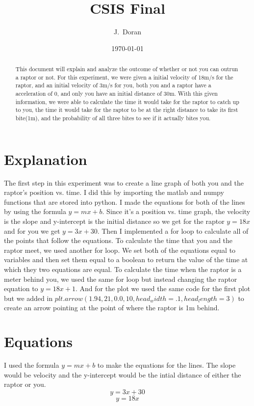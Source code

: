 \documentclass[twocolumn]{revtex4}
\begin{document}
\title{
CSIS Final
}

\author{J.~Doran}

\date{\today}

\begin{abstract}
 	This document will explain and analyze the outcome of whether or not you can outrun a raptor or not. For this experiment, we were given a initial velocity of 18m/s for the raptor, and an initial velocity of 3m/s for you, both you and a raptor have a acceleration of 0, and only you have an initial distance of 30m. With this given information, we were able to calculate the time it would take for the raptor to catch up to you, the time it would take for the raptor to be at the right distance to take its first bite(1m), and the probability of all three bites to see if it actually bites you. 
 	 
\end{abstract}

\maketitle

\section{Explanation}
	The first step in this experiment was to create a line graph of both you and the raptor's position vs. time.  I did this by importing the matlab and numpy functions that are stored into python. I made the equations for both of the lines by using the formula {\it $y=mx+b$}. Since it's a position vs. time graph, the velocity is the slope and y-intercept is the initial distance so we get for the raptor {\it $y=18x$} and for you we get {\it $y=3x+30$}. Then I implemented a for loop to calculate all of the points that follow the equations. 
	To calculate the time that you and the raptor meet, we used another for loop. We set both of the equations equal to variables and then set them equal to a boolean to return the value of the time at which they two equations are equal. 
	To calculate the time when the raptor is a meter behind you, we used the same for loop but instead changing the raptor equation to {\it $y=18x+1$}.  And for the plot we used the same code for the first plot but we added in {\it $plt.arrow(1.94,21,0.0,10,head_width=.1,head_length=3)$ } to create an arrow pointing at the point of where the raptor is 1m behind. 
	
\section{Equations}
I used the formula $y=mx+b$ to make the equations for the lines. The slope would be velocity and the y-intercept would be the intial distance of either the raptor or you. 
$$y=3x+30$$
$$y=18x$$
\end{document}

